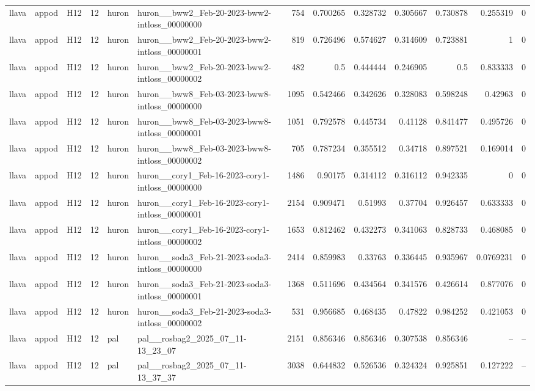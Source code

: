 \begin{longtable}{lllrllrrrrrrr}
llava & appod & H12 & 12 & huron & huron\_\_bww2\_Feb-20-2023-bww2-intloss\_00000000 & 754 & 0.700265 & 0.328732 & 0.305667 & 0.730878 & 0.255319 & 0 \\
llava & appod & H12 & 12 & huron & huron\_\_bww2\_Feb-20-2023-bww2-intloss\_00000001 & 819 & 0.726496 & 0.574627 & 0.314609 & 0.723881 & 1 & 0 \\
llava & appod & H12 & 12 & huron & huron\_\_bww2\_Feb-20-2023-bww2-intloss\_00000002 & 482 & 0.5 & 0.444444 & 0.246905 & 0.5 & 0.833333 & 0 \\
llava & appod & H12 & 12 & huron & huron\_\_bww8\_Feb-03-2023-bww8-intloss\_00000000 & 1095 & 0.542466 & 0.342626 & 0.328083 & 0.598248 & 0.42963 & 0 \\
llava & appod & H12 & 12 & huron & huron\_\_bww8\_Feb-03-2023-bww8-intloss\_00000001 & 1051 & 0.792578 & 0.445734 & 0.41128 & 0.841477 & 0.495726 & 0 \\
llava & appod & H12 & 12 & huron & huron\_\_bww8\_Feb-03-2023-bww8-intloss\_00000002 & 705 & 0.787234 & 0.355512 & 0.34718 & 0.897521 & 0.169014 & 0 \\
llava & appod & H12 & 12 & huron & huron\_\_cory1\_Feb-16-2023-cory1-intloss\_00000000 & 1486 & 0.90175 & 0.314112 & 0.316112 & 0.942335 & 0 & 0 \\
llava & appod & H12 & 12 & huron & huron\_\_cory1\_Feb-16-2023-cory1-intloss\_00000001 & 2154 & 0.909471 & 0.51993 & 0.37704 & 0.926457 & 0.633333 & 0 \\
llava & appod & H12 & 12 & huron & huron\_\_cory1\_Feb-16-2023-cory1-intloss\_00000002 & 1653 & 0.812462 & 0.432273 & 0.341063 & 0.828733 & 0.468085 & 0 \\
llava & appod & H12 & 12 & huron & huron\_\_soda3\_Feb-21-2023-soda3-intloss\_00000000 & 2414 & 0.859983 & 0.33763 & 0.336445 & 0.935967 & 0.0769231 & 0 \\
llava & appod & H12 & 12 & huron & huron\_\_soda3\_Feb-21-2023-soda3-intloss\_00000001 & 1368 & 0.511696 & 0.434564 & 0.341576 & 0.426614 & 0.877076 & 0 \\
llava & appod & H12 & 12 & huron & huron\_\_soda3\_Feb-21-2023-soda3-intloss\_00000002 & 531 & 0.956685 & 0.468435 & 0.47822 & 0.984252 & 0.421053 & 0 \\
llava & appod & H12 & 12 & pal & pal\_\_rosbag2\_2025\_07\_11-13\_23\_07 & 2151 & 0.856346 & 0.856346 & 0.307538 & 0.856346 & -- & -- \\
llava & appod & H12 & 12 & pal & pal\_\_rosbag2\_2025\_07\_11-13\_37\_37 & 3038 & 0.644832 & 0.526536 & 0.324324 & 0.925851 & 0.127222 & -- \\

\end{longtable}
